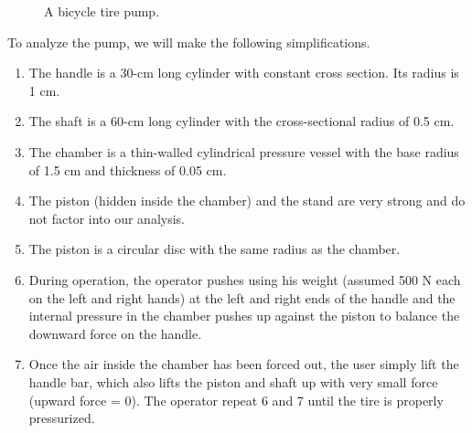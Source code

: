 \documentclass[a4paper,openany,12pt]{book}
\begin{document}
{{\begin{figure}[h]
  \centering
  \caption{A bicycle tire pump.}
  \label{fig: bike pump}
\end{figure}

To analyze the pump, we will make the following simplifications.

\begin{enumerate}
\item The handle is a 30-cm long cylinder with constant cross section. Its
radius is 1 cm.

\item The shaft is a 60-cm long cylinder with the cross-sectional radius of
0.5 cm.

\item The chamber is a thin-walled cylindrical pressure vessel with the
base radius of 1.5 cm and thickness of 0.05 cm.

\item The piston (hidden inside the chamber) and the stand are very strong
and do not factor into our analysis.

\item The piston is a circular disc with the same radius as the chamber.

\item During operation, the operator pushes using his weight (assumed 500 N
each on the left and right hands) at the left and right ends of the
handle and the internal pressure in the chamber pushes up against the
piston to balance the downward force on the handle.

\item Once the air inside the chamber has been forced out, the user simply
lift the handle bar, which also lifts the piston and shaft up with
very small force (upward force = 0). The operator repeat 6 and 7
until the tire is properly pressurized.


\end{enumerate}}}
\end{document}
